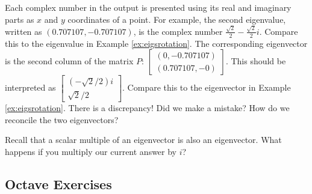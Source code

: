 \documentclass{ximera}
\begin{document}
\begin{example}
\begin{explanation}
  Each complex number in the output is presented using its real and imaginary parts as $x$ and $y$ coordinates of a point.  For example, the second eigenvalue, written as $(0.707107,-0.707107)$, is the complex number $\frac{\sqrt{2}}{2}-\frac{\sqrt{2}}{2}i$.  Compare this to the eigenvalue in Example \ref{ex:eigsrotation}.  The corresponding eigenvector is the second column of the matrix $P$: $\begin{bmatrix}(0,-0.707107)\\(0.707107,-0)\end{bmatrix}$.  This should be interpreted as $\begin{bmatrix}(-\sqrt{2}/2)i\\\sqrt{2}/2\end{bmatrix}$.  Compare this to the eigenvector in Example \ref{ex:eigsrotation}.  There is a discrepancy!  Did we make a mistake?  How do we reconcile the two eigenvectors?
  \begin{hint}
      Recall that a scalar multiple of an eigenvector is also an eigenvector.  What happens if you multiply our current answer by $i$?
  \end{hint}
  \end{explanation}
  \end{example}

\subsection*{Octave Exercises}
\end{document}

